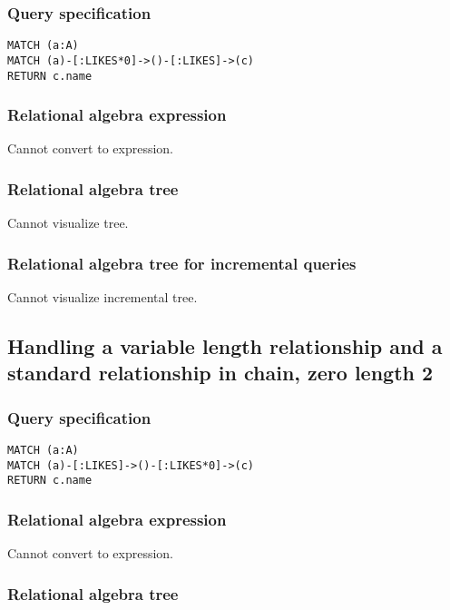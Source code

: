 \subsubsection*{Query specification}

\begin{lstlisting}
MATCH (a:A)
MATCH (a)-[:LIKES*0]->()-[:LIKES]->(c)
RETURN c.name
\end{lstlisting}

\subsubsection*{Relational algebra expression}

Cannot convert to expression.

\subsubsection*{Relational algebra tree}

Cannot visualize tree.

\subsubsection*{Relational algebra tree for incremental queries}

Cannot visualize incremental tree.

\subsection{Handling a variable length relationship and a standard relationship in chain, zero length 2}

\subsubsection*{Query specification}

\begin{lstlisting}
MATCH (a:A)
MATCH (a)-[:LIKES]->()-[:LIKES*0]->(c)
RETURN c.name
\end{lstlisting}

\subsubsection*{Relational algebra expression}

Cannot convert to expression.

\subsubsection*{Relational algebra tree}

